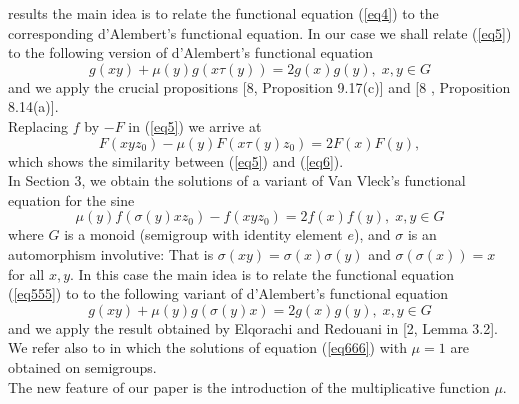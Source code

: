 \documentclass[12pt]{amsart}
\theoremstyle{definition}
\theoremstyle{remark}
\numberwithin{equation}{section}
\begin{document}
results the main idea is to relate the functional equation
(\ref{eq4}) to the corresponding  d'Alembert's functional equation.
In our case we shall relate (\ref{eq5}) to the following version of
d'Alembert's functional equation
\begin{equation}\label{eq6}
    g(xy)+\mu(y)g(x\tau(y))=2g(x)g(y),\;x,y\in G
\end{equation} and we apply the crucial propositions [8, Proposition 9.17(c)] and [8
, Proposition
8.14(a)]. \\Replacing $f$ by $-F$ in (\ref{eq5}) we arrive at
$$F(xyz_0)-\mu(y)F(x\tau(y)z_0) = 2F(x)F(y),$$ which shows the similarity
between (\ref{eq5}) and (\ref{eq6}).\\
In Section 3, we obtain the solutions of a variant of Van Vleck's
functional equation for the sine
\begin{equation}\label{eq555}
\mu(y)f(\sigma(y)xz_0)-f(xyz_0) = 2f(x)f(y),\; x,y\in
G\end{equation}
 where $G$ is a monoid (semigroup with identity
element $e$), and  $\sigma$ is an automorphism involutive: That is
$\sigma(xy)=\sigma(x)\sigma(y)$ and $\sigma(\sigma(x))=x$ for all
$x,y$. In this case the main idea is to relate the functional
equation (\ref{eq555}) to  to the following variant of d'Alembert's
functional equation
\begin{equation}\label{eq666}
    g(xy)+\mu(y)g(\sigma(y)x)=2g(x)g(y),\;x,y\in G
\end{equation} and we apply the result obtained by Elqorachi and Redouani in [2, Lemma 3.2]. We refer also to \cite{stetkaer}
 in which the solutions of equation (\ref{eq666}) with $\mu=1$ are obtained on semigroups. \\The new feature of our paper is the introduction of the
multiplicative function $\mu$.
\end{document}
